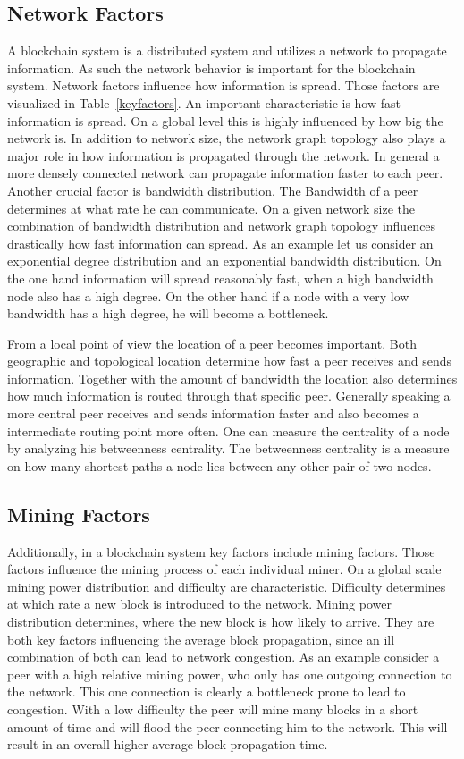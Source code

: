 \subsection{Network Factors}
A blockchain system is a distributed system and utilizes a network to propagate information. As such the network behavior is important for the blockchain system. Network factors influence how information is spread. Those factors are visualized in Table~\ref{keyfactors}. An important characteristic is how fast information is spread. On a global level this is highly influenced by how big the network is. In addition to network size, the network graph topology also plays a major role in how information is propagated through the network. In general a more densely connected network can propagate information faster to each peer. Another crucial factor is bandwidth distribution. The Bandwidth of a peer determines at what rate he can communicate. On a given network size the combination of bandwidth distribution and network graph topology influences drastically how fast information can spread. As an example let us consider an exponential degree distribution and an exponential bandwidth distribution. On the one hand information will spread reasonably fast, when a high bandwidth node also has a high degree. On the other hand if a node with a very low bandwidth has a high degree, he will become a bottleneck.

From a local point of view the location of a peer becomes important. Both geographic and topological location determine how fast a peer receives and sends information. Together with the amount of bandwidth the location also determines how much information is routed through that specific peer. Generally speaking a more central peer receives and sends information faster and also becomes a intermediate routing point more often. One can measure the centrality of a node by analyzing his betweenness centrality. The betweenness centrality is a measure on how many shortest paths a node lies between any other pair of two nodes. 
\subsection{Mining Factors}
Additionally, in a blockchain system key factors include mining factors. Those factors influence the mining process of each individual miner. On a global scale mining power distribution and difficulty are characteristic. Difficulty determines at which rate a new block is introduced to the network. Mining power distribution determines, where the new block is how likely to arrive. They are both key factors influencing the average block propagation, since an ill combination of both can lead to network congestion. As an example consider a peer with a high relative mining power, who only has one outgoing connection to the network. This one connection is clearly a bottleneck prone to lead to congestion. With a low difficulty the peer will mine many blocks in a short amount of time and will flood the peer connecting him to the network. This will result in an overall higher average block propagation time.

